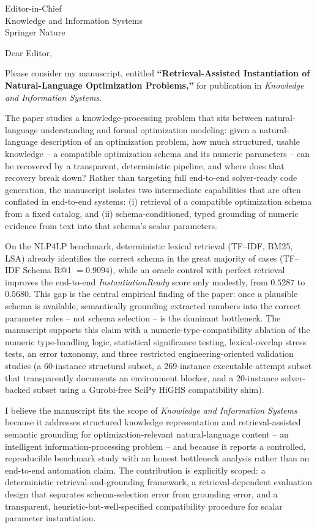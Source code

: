 \documentclass[12pt]{letter}
\begin{document}
\begin{letter}{Editor-in-Chief\\
Knowledge and Information Systems\\
Springer Nature}

\opening{Dear Editor,}

Please consider my manuscript, entitled \textbf{``Retrieval-Assisted Instantiation of Natural-Language Optimization Problems,''} for publication in \textit{Knowledge and Information Systems}.

The paper studies a knowledge-processing problem that sits between natural-language understanding and formal optimization modeling: given a natural-language description of an optimization problem, how much structured, usable knowledge -- a compatible optimization schema and its numeric parameters -- can be recovered by a transparent, deterministic pipeline, and where does that recovery break down? Rather than targeting full end-to-end solver-ready code generation, the manuscript isolates two intermediate capabilities that are often conflated in end-to-end systems: (i) retrieval of a compatible optimization schema from a fixed catalog, and (ii) schema-conditioned, typed grounding of numeric evidence from text into that schema's scalar parameters.

On the \textsc{NLP4LP} benchmark, deterministic lexical retrieval (TF--IDF, BM25, LSA) already identifies the correct schema in the great majority of cases (TF--IDF Schema R@1 $=0.9094$), while an oracle control with perfect retrieval improves the end-to-end \textit{InstantiationReady} score only modestly, from $0.5287$ to $0.5680$. This gap is the central empirical finding of the paper: once a plausible schema is available, semantically grounding extracted numbers into the correct parameter roles -- not schema selection -- is the dominant bottleneck. The manuscript supports this claim with a numeric-type-compatibility ablation of the numeric type-handling logic, statistical significance testing, lexical-overlap stress tests, an error taxonomy, and three restricted engineering-oriented validation studies (a 60-instance structural subset, a 269-instance executable-attempt subset that transparently documents an environment blocker, and a 20-instance solver-backed subset using a Gurobi-free SciPy HiGHS compatibility shim).

I believe the manuscript fits the scope of \textit{Knowledge and Information Systems} because it addresses structured knowledge representation and retrieval-assisted semantic grounding for optimization-relevant natural-language content -- an intelligent information-processing problem -- and because it reports a controlled, reproducible benchmark study with an honest bottleneck analysis rather than an end-to-end automation claim. The contribution is explicitly scoped: a deterministic retrieval-and-grounding framework, a retrieval-dependent evaluation design that separates schema-selection error from grounding error, and a transparent, heuristic-but-well-specified compatibility procedure for scalar parameter instantiation.


\end{letter}
\end{document}
